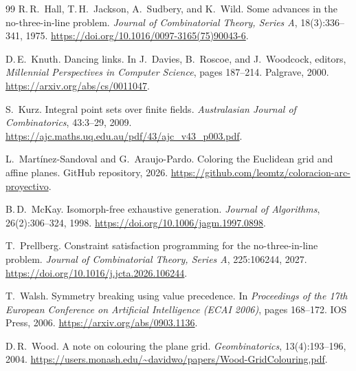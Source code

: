 \documentclass[11pt]{article}
\theoremstyle{definition}
\theoremstyle{remark}
\begin{document}
\begin{thebibliography}{99}
R.\,R.~Hall, T.\,H.~Jackson, A.~Sudbery, and K.~Wild.
\newblock Some advances in the no-three-in-line problem.
\newblock \emph{Journal of Combinatorial Theory, Series A}, 18(3):336--341,
  1975.
\newblock \url{https://doi.org/10.1016/0097-3165(75)90043-6}.



D.\,E.~Knuth.
\newblock Dancing links.
\newblock In J.~Davies, B.~Roscoe, and J.~Woodcock, editors,
  \emph{Millennial Perspectives in Computer Science}, pages 187--214.
  Palgrave, 2000.
\newblock \url{https://arxiv.org/abs/cs/0011047}.

S.~Kurz.
\newblock Integral point sets over finite fields.
\newblock \emph{Australasian Journal of Combinatorics}, 43:3--29, 2009.
\newblock \url{https://ajc.maths.uq.edu.au/pdf/43/ajc_v43_p003.pdf}.

L.~Mart\'{i}nez-Sandoval and G.~Araujo-Pardo.
\newblock Coloring the {Euclidean} grid and affine planes.
\newblock GitHub repository, 2026.
\newblock \url{https://github.com/leomtz/coloracion-arc-proyectivo}.

B.\,D.~McKay.
\newblock Isomorph-free exhaustive generation.
\newblock \emph{Journal of Algorithms}, 26(2):306--324, 1998.
\newblock \url{https://doi.org/10.1006/jagm.1997.0898}.

T.~Prellberg.
\newblock Constraint satisfaction programming for the no-three-in-line
  problem.
\newblock \emph{Journal of Combinatorial Theory, Series A}, 225:106244, 2027.
\newblock \url{https://doi.org/10.1016/j.jcta.2026.106244}.

T.~Walsh.
\newblock Symmetry breaking using value precedence.
\newblock In \emph{Proceedings of the 17th European Conference on
  Artificial Intelligence (ECAI 2006)}, pages 168--172. IOS Press, 2006.
\newblock \url{https://arxiv.org/abs/0903.1136}.

D.\,R.~Wood.
\newblock A note on colouring the plane grid.
\newblock \emph{Geombinatorics}, 13(4):193--196, 2004.
\newblock \url{https://users.monash.edu/~davidwo/papers/Wood-GridColouring.pdf}.


\end{thebibliography}
\end{document}

